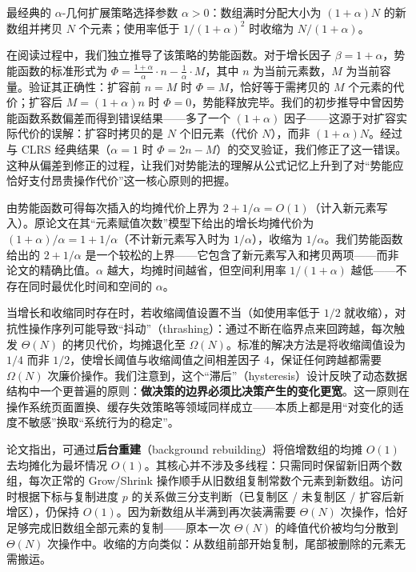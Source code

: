 \documentclass[12pt,a4paper]{ctexart}
\begin{document}
最经典的 $\alpha$-几何扩展策略选择参数 $\alpha > 0$：数组满时分配大小为 $(1+\alpha)N$ 的新数组并拷贝 $N$ 个元素；使用率低于 $1/(1+\alpha)^2$ 时收缩为 $N/(1+\alpha)$。

在阅读过程中，我们独立推导了该策略的势能函数。对于增长因子 $\beta = 1+\alpha$，势能函数的标准形式为 $\Phi = \frac{1+\alpha}{\alpha} \cdot n - \frac{1}{\alpha} \cdot M$，其中 $n$ 为当前元素数，$M$ 为当前容量。验证其正确性：扩容前 $n = M$ 时 $\Phi = M$，恰好等于需拷贝的 $M$ 个元素的代价；扩容后 $M = (1+\alpha)n$ 时 $\Phi = 0$，势能释放完毕。我们的初步推导中曾因势能函数系数偏差而得到错误结果——多了一个 $(1+\alpha)$ 因子——这源于对扩容实际代价的误解：扩容时拷贝的是 $N$ 个旧元素（代价 $N$），而非 $(1+\alpha)N$。经过与 CLRS 经典结果（$\alpha=1$ 时 $\Phi = 2n - M$）的交叉验证，我们修正了这一错误。这种从偏差到修正的过程，让我们对势能法的理解从公式记忆上升到了对``势能应恰好支付昂贵操作代价''这一核心原则的把握。

由势能函数可得每次插入的均摊代价上界为 $2 + 1/\alpha = O(1)$（计入新元素写入）。原论文在其``元素赋值次数''模型下给出的增长均摊代价为 $(1+\alpha)/\alpha = 1 + 1/\alpha$（不计新元素写入时为 $1/\alpha$），收缩为 $1/\alpha$。我们势能函数给出的 $2 + 1/\alpha$ 是一个较松的上界——它包含了新元素写入和拷贝两项——而非论文的精确比值。$\alpha$ 越大，均摊时间越省，但空间利用率 $1/(1+\alpha)$ 越低——不存在同时最优化时间和空间的 $\alpha$。

当增长和收缩同时存在时，若收缩阈值设置不当（如使用率低于 $1/2$ 就收缩），对抗性操作序列可能导致``抖动''（thrashing）：通过不断在临界点来回跨越，每次触发 $\Theta(N)$ 的拷贝代价，均摊退化至 $\Omega(N)$。标准的解决方法是将收缩阈值设为 $1/4$ 而非 $1/2$，使增长阈值与收缩阈值之间相差因子 $4$，保证任何跨越都需要 $\Omega(N)$ 次廉价操作。我们注意到，这个``滞后''（hysteresis）设计反映了动态数据结构中一个更普遍的原则：\textbf{做决策的边界必须比决策产生的变化更宽}。这一原则在操作系统页面置换、缓存失效策略等领域同样成立——本质上都是用``对变化的适度不敏感''换取``系统行为的稳定''。

论文指出，可通过\textbf{后台重建}（background rebuilding）将倍增数组的均摊 $O(1)$ 去均摊化为最坏情况 $O(1)$。其核心并不涉及多线程：只需同时保留新旧两个数组，每次正常的 Grow/Shrink 操作顺手从旧数组复制常数个元素到新数组。访问时根据下标与复制进度 $p$ 的关系做三分支判断（已复制区 / 未复制区 / 扩容后新增区），仍保持 $O(1)$。因为新数组从半满到再次装满需要 $\Theta(N)$ 次操作，恰好足够完成旧数组全部元素的复制——原本一次 $\Theta(N)$ 的峰值代价被均匀分散到 $\Theta(N)$ 次操作中。收缩的方向类似：从数组前部开始复制，尾部被删除的元素无需搬运。
\end{document}
